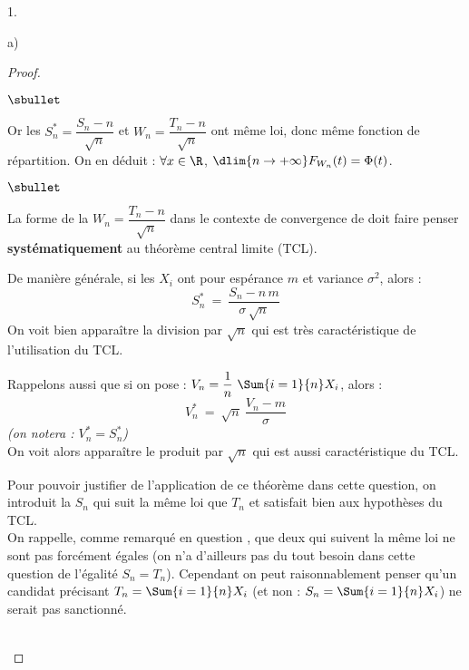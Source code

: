 \documentclass[11pt]{article}%
\begin{document}
\begin{noliste}{1.}
\begin{noliste}{a)}
\begin{proof}
\begin{noliste}{$\sbullet$}
      \item Or les \var $S_n^* = \dfrac{S_n-n}{\sqrt{n}}$ et $W_n =
        \dfrac{T_n - n}{\sqrt{n}}$ ont
        même loi, donc même fonction de répartition. On en déduit :
        $\forall x \in \R$, $\dlim{n\to +\infty} F_{W_n}(t) =
        \Phi(t)$.
      \end{noliste}


      \newpage


      \begin{remarkL}{1}
        \begin{noliste}{$\sbullet$}
        \item La forme de la \var $W_n = \dfrac{T_n -n}{\sqrt{n}}$ dans le
          contexte de convergence de \var doit faire penser {\bf
          systématiquement} au théorème central limite (TCL).
          
        \item De manière générale, si les $X_i$ ont pour espérance $m$
          et variance $\sigma^2$, alors :
          \[
            S_n^* \ = \ \dfrac{S_n - n \, m}{\sigma \, \sqrt{n}}
          \]
          On voit bien apparaître la division par $\sqrt{n}$ qui est
          très caractéristique de l'utilisation du TCL.
          
        \item Rappelons aussi que si on pose : $V_n = \dfrac{1}{n} \
          \Sum{i=1}{n} X_i$, alors :
          \[
            V_n^* \ = \ \sqrt{n} \ \dfrac{V_n - m}{\sigma}
          \]
          {\it (on notera : $V_n^* = S_n^*$)}\\
          On voit alors apparaître le produit par $\sqrt{n}$ qui est aussi
          caractéristique du TCL.
          
        \item Pour pouvoir justifier de l'application de ce théorème
          dans cette question, on introduit la \var $S_n$ qui suit la
          même loi que $T_n$ et satisfait bien aux hypothèses du
          TCL.\\
          On rappelle, comme remarqué en question , que deux
          \var qui suivent la même loi ne sont pas forcément égales
          (on n'a d'ailleurs pas du tout besoin dans cette question de
          l'égalité $S_n = T_n$).
          Cependant on peut raisonnablement penser qu'un candidat
          précisant \og $T_n = \Sum{i=1}{n} X_i$ \fg{} (et non : $S_n
          = \Sum{i=1}{n} X_i$) ne serait pas sanctionné.
        \end{noliste}
      \end{remarkL}~\\[-1.4cm]
    \end{proof}
    

\end{noliste}
\end{noliste}
\end{document}
